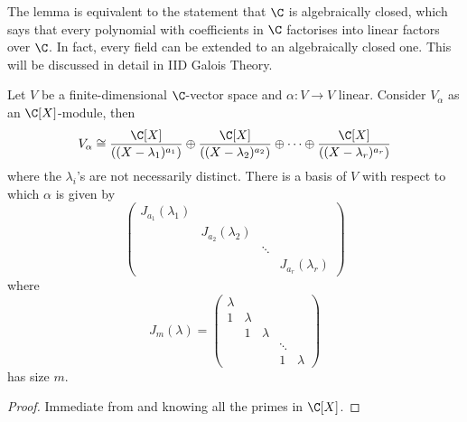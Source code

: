 \documentclass[a4paper]{article}
\theoremstyle{definition}
\begin{document}
\begin{remark}
  The lemma is equivalent to the statement that \(\C\) is algebraically closed, which says that every polynomial with coefficients in \(\C\) factorises into linear factors over \(\C\). In fact, every field can be extended to an algebraically closed one. This will be discussed in detail in IID Galois Theory.
\end{remark}

\begin{theorem}
  Let \(V\) be a finite-dimensional \(\C\)-vector space and \(\alpha:V \to V\) linear. Consider \(V_\alpha\) as an \(\C[X]\)-module, then
  \[
    V_\alpha \cong \frac{\C[X]}{((X - \lambda_1)^{a_1})} \oplus \frac{\C[X]}{((X - \lambda_2)^{a_2})} \oplus \dots \oplus \frac{\C[X]}{((X - \lambda_r)^{a_r})}
    \]
    where the \(\lambda_i\)'s are not necessarily distinct. There is a basis of \(V\) with respect to which \(\alpha\) is given by
    \[
      \begin{pmatrix}
        J_{a_1}(\lambda_1) \\
        & J_{a_2}(\lambda_2) \\
        & & \ddots \\
        & & & J_{a_r}(\lambda_r)
      \end{pmatrix}
    \]
    where
    \[
      J_m(\lambda) =
      \begin{pmatrix}
        \lambda \\
        1 & \lambda \\
        & 1 & \lambda \\
        & & & \ddots \\
        & & & 1 & \lambda
      \end{pmatrix}
    \]
    has size \(m\).
\end{theorem}

\begin{proof}
  Immediate from  and knowing all the primes in \(\C[X]\).
\end{proof}
\end{document}
